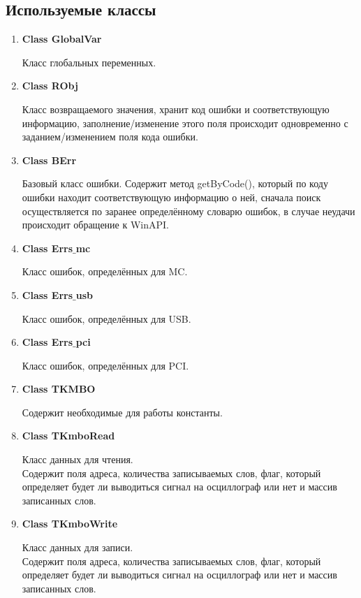 \newpage

\subsection{Используемые классы}
	\begin{enumerate}
		\item \textbf{Class GlobalVar}
		
		Класс глобальных переменных.
		
		\item \textbf{Class RObj}
		
		Класс возвращаемого значения, хранит код ошибки и соответствующую информацию, заполнение/изменение этого поля происходит одновременно с заданием/изменением поля кода ошибки. 
		
		\item \textbf{Class BErr}
		
		Базовый класс ошибки. Содержит метод getByCode(), который по коду ошибки находит соответствующую информацию о ней, сначала поиск осуществляется по заранее определённому словарю ошибок, в случае неудачи происходит обращение к WinAPI.
		
		\item \textbf{Class Errs$\_$mc}
		
		Класс ошибок, определённых для MC.
		
		\item \textbf{Class Errs$\_$usb}
		
		Класс ошибок, определённых для USB.
		
		\item \textbf{Class Errs$\_$pci}
		
		Класс ошибок, определённых для PCI.
		
		\item \textbf{Class TKMBO}
		
		Содержит необходимые для работы константы.
		
		\item \textbf{Class TKmboRead}
		
		Класс данных для чтения. \\
		Содержит поля адреса, количества записываемых слов, флаг, который определяет будет ли выводиться сигнал на осциллограф или нет и массив записанных слов.
		
		\item \textbf{Class TKmboWrite}
		
		Класс данных для записи. \\
		Содержит поля адреса, количества записываемых слов, флаг, который определяет будет ли выводиться сигнал на осциллограф или нет и массив записанных слов.
		

\end{enumerate}

